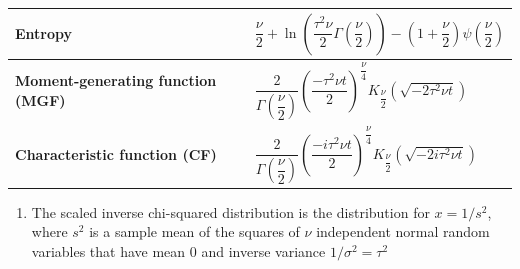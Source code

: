 \begin{alternateColorTable}
\begin{longtable}{|m{6cm}|p{9cm}|}
    \textbf{Entropy} &
    ${\displaystyle {\dfrac {\nu }{2}}\!+\!\ln \left({\dfrac {\tau ^{2}\nu }{2}}\Gamma \left({\dfrac {\nu }{2}}\right)\right)}{\displaystyle \!-\!\left(1\!+\!{\dfrac {\nu }{2}}\right)\psi \left({\dfrac {\nu }{2}}\right)}$
    \\[1ex] \hline

    \textbf{Moment-generating function (MGF)} &
    ${\displaystyle {\dfrac {2}{\Gamma ({\dfrac {\nu }{2}})}}\left({\dfrac {-\tau ^{2}\nu t}{2}}\right)^{\!\!{\dfrac {\nu }{4}}}\!\!K_{\dfrac {\nu }{2}}\left({\sqrt {-2\tau ^{2}\nu t}}\right)}$
    \\[1ex] \hline

    \textbf{Characteristic function (CF)} &
    ${\displaystyle {\dfrac {2}{\Gamma ({\dfrac {\nu }{2}})}}\left({\dfrac {-i\tau ^{2}\nu t}{2}}\right)^{\!\!{\dfrac {\nu }{4}}}\!\!K_{\dfrac {\nu }{2}}\left({\sqrt {-2i\tau ^{2}\nu t}}\right)}$
    \\[1ex] \hline

\end{longtable}
\renewcommand{\arraystretch}{1}
\end{alternateColorTable}

\begin{enumerate}
    \item The scaled inverse chi-squared distribution is the distribution for $x = 1/s^2$, where $s^2$ is a sample mean of the squares of $\nu$ independent normal random variables that have mean $0$ and inverse variance $1/\sigma^2 = \tau^2$

\end{enumerate}























































